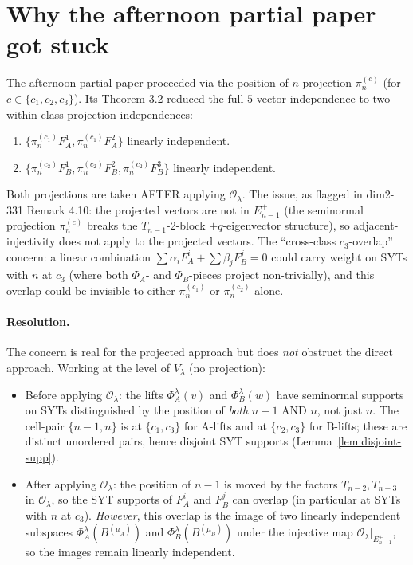 \documentclass[11pt]{article}
\theoremstyle{definition}
\begin{document}
\section{Why the afternoon partial paper got stuck}\label{sec:partial}

The afternoon partial paper proceeded via the position-of-$n$
projection $\pi^{(c)}_n$ (for $c \in \{c_1, c_2, c_3\}$). Its
Theorem 3.2 reduced the full $5$-vector independence to two
within-class projection independences:
\begin{enumerate}[leftmargin=2em,topsep=0.2em,itemsep=0.1em,label=(\alph*)]
\item $\{\pi^{(c_1)}_n F_A^1, \pi^{(c_1)}_n F_A^2\}$ linearly
independent.
\item $\{\pi^{(c_2)}_n F_B^1, \pi^{(c_2)}_n F_B^2, \pi^{(c_2)}_n F_B^3\}$
linearly independent.
\end{enumerate}
Both projections are taken AFTER applying $\mathcal{O}_\lambda$. The
issue, as flagged in dim2-331 Remark 4.10: the projected vectors are
not in $E_{n-1}^+$ (the seminormal projection
$\pi^{(c)}_n$ breaks the $T_{n-1}$-2-block $+q$-eigenvector structure),
so adjacent-injectivity does not apply to the projected vectors. The
``cross-class $c_3$-overlap'' concern: a linear combination
$\sum \alpha_i F_A^i + \sum \beta_j F_B^j = 0$ could carry weight on
SYTs with $n$ at $c_3$ (where both $\Phi_A$- and $\Phi_B$-pieces
project non-trivially), and this overlap could be invisible to either
$\pi^{(c_1)}_n$ or $\pi^{(c_2)}_n$ alone.

\paragraph{Resolution.} The concern is real for the projected approach
but does \emph{not} obstruct the direct approach. Working at the
level of $V_\lambda$ (no projection):

\begin{itemize}[leftmargin=2em,topsep=0.2em,itemsep=0.2em]
\item Before applying $\mathcal{O}_\lambda$: the lifts
$\Phi_A^\lambda(v)$ and $\Phi_B^\lambda(w)$ have seminormal supports
on SYTs distinguished by the position of \emph{both} $n-1$ AND $n$,
not just $n$. The cell-pair $\{n-1, n\}$ is at $\{c_1, c_3\}$ for
A-lifts and at $\{c_2, c_3\}$ for B-lifts; these are distinct
unordered pairs, hence disjoint SYT supports
(Lemma~\ref{lem:disjoint-supp}).
\item After applying $\mathcal{O}_\lambda$: the position of $n-1$ is
moved by the factors $T_{n-2}, T_{n-3}$ in $\mathcal{O}_\lambda$, so
the SYT supports of $F_A^i$ and $F_B^j$ can overlap (in particular at
SYTs with $n$ at $c_3$). \emph{However}, this overlap is the image of
two linearly independent subspaces $\Phi_A^\lambda(B^{(\mu_A)})$ and
$\Phi_B^\lambda(B^{(\mu_B)})$ under the injective map
$\mathcal{O}_\lambda|_{E_{n-1}^+}$, so the images remain linearly
independent.
\end{itemize}
\end{document}
